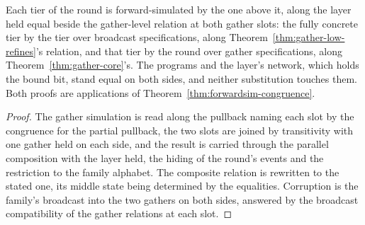 \begin{theorem}
  \label{thm:gbca-tier-refines}
  \leanok
  Each tier of the round is forward-simulated by the one above it, along the layer held equal beside the gather-level relation at both gather slots: the fully concrete tier by the tier over broadcast specifications, along Theorem~\ref{thm:gather-low-refines}'s relation, and that tier by the round over gather specifications, along Theorem~\ref{thm:gather-core}'s.
  The programs and the layer's network, which holds the bound bit, stand equal on both sides, and neither substitution touches them.
  Both proofs are applications of Theorem~\ref{thm:forwardsim-congruence}.
\end{theorem}

\begin{proof}\leanok
  The gather simulation is read along the pullback naming each slot by the congruence for the partial pullback, the two slots are joined by transitivity with one gather held on each side, and the result is carried through the parallel composition with the layer held, the hiding of the round's events and the restriction to the family alphabet.
  The composite relation is rewritten to the stated one, its middle state being determined by the equalities.
  Corruption is the family's broadcast into the two gathers on both sides, answered by the broadcast compatibility of the gather relations at each slot.
\end{proof}
